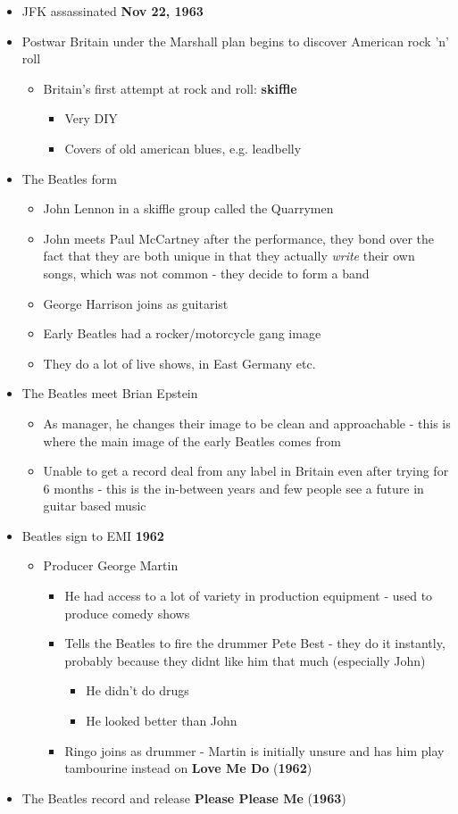 \documentclass[11pt]{report}
\newcommand{\imp}[1]{\textbf{#1}}
\newcommand{\idate}[2]{\textcolor{blue!50}{\imp{#1}}\label{date:#2}}
\newcommand{\bl}{\begin{itemize}}
\newcommand{\kl}{\end{itemize}}
\newcommand{\song}[2]{\textcolor{red!70}{\textbf{#1}} (\idate{#2}{#1})}
\begin{document}
\begin{itemize}
	\item JFK assassinated \idate{Nov 22, 1963}{jfk}
	\item Postwar Britain under the Marshall plan begins to discover American rock 'n' roll
	\bl
		\item Britain's first attempt at rock and roll: \imp{skiffle}
		\bl
			\item Very DIY
			\item Covers of old american blues, e.g. leadbelly
		\kl
	\kl
	\item The Beatles form
	\bl
		\item John Lennon in a skiffle group called the Quarrymen
		\item John meets Paul McCartney after the performance, they bond over the fact that they are both unique in that they actually \textit{write} their own songs, which was not common - they decide to form a band
		\item George Harrison joins as guitarist
		\item Early Beatles had a rocker/motorcycle gang image
		\item They do a lot of live shows, in East Germany etc.
	\kl
	\item The Beatles meet Brian Epstein
	\bl
		\item As manager, he changes their image to be clean and approachable - this is where the main image of the early Beatles comes from
		\item Unable to get a record deal from any label in Britain even after trying for 6 months - this is the in-between years and few people see a future in guitar based music
	\kl
	\item Beatles sign to EMI \idate{1962}{beatles-emi}
	\bl
		\item Producer George Martin
		\bl
			\item He had access to a lot of variety in production equipment - used to produce comedy shows
			\item Tells the Beatles to fire the drummer Pete Best - they do it instantly, probably because they didnt like him that much (especially John)
			\bl
				\item He didn't do drugs
				\item He looked better than John
			\kl
			\item Ringo joins as drummer - Martin is initially unsure and has him play tambourine instead on \song{Love Me Do}{1962}
		\kl
	\kl
	\item The Beatles record and release \song{Please Please Me}{1963}

\end{itemize}
\end{document}
